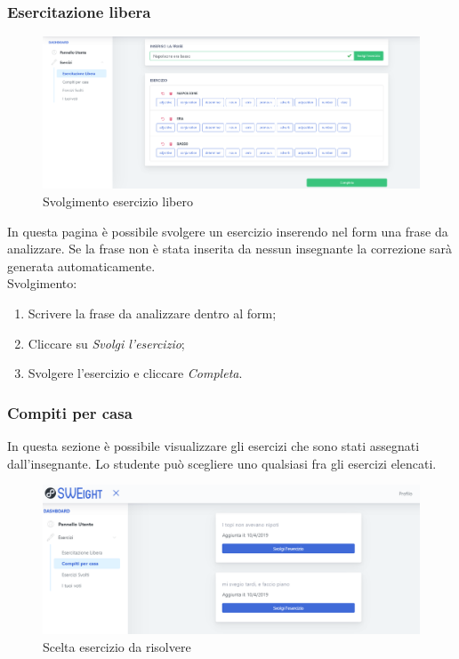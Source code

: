         
               
	\newpage
        \subsubsection{Esercitazione libera}      
        	\begin{figure}[H]
                \centering
                \includegraphics[width=17cm]{sez/img/studente/esercitazioneLiberaEsegui.PNG} 
                \caption{Svolgimento esercizio libero}\label{fig:1}
        	\end{figure}
          In questa pagina è possibile svolgere un esercizio inserendo nel form una frase da analizzare.
          Se la frase non è stata inserita da nessun insegnante la 
        correzione sarà generata automaticamente.
        \\ Svolgimento:
        	\begin{enumerate}        
            	\item Scrivere la frase da analizzare dentro al form;
            	\item Cliccare su \textit{Svolgi l'esercizio};
            	\item Svolgere l'esercizio e cliccare \textit{Completa}.
        	\end{enumerate}

      
        \newpage
  		\subsubsection{Compiti per casa}
 		  In questa sezione è possibile visualizzare gli esercizi che sono stati assegnati dall'insegnante. Lo studente può scegliere uno qualsiasi fra gli esercizi elencati.
        	\begin{figure}[H]
            	\centering
            	\includegraphics[width=17cm]{sez/img/studente/compitopercasa.PNG} 
            	\caption{Scelta esercizio da risolvere}\label{fig:1}
        	\end{figure}

